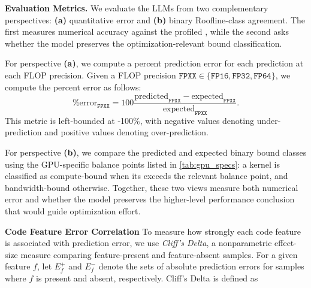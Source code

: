 \textbf{Evaluation Metrics.}
We evaluate the LLMs from two complementary perspectives: \textbf{(a)} quantitative \rai error and \textbf{(b)} binary Roofline-class agreement.
The first measures numerical accuracy against the profiled \rai, while the second asks whether the model preserves the optimization-relevant bound classification.

For perspective \textbf{(a)}, we compute a percent prediction error for each \rai prediction at each FLOP precision.
Given a FLOP precision $\texttt{FPXX} \in \{\texttt{FP16}, \texttt{FP32}, \texttt{FP64}\}$, we compute the percent error as follows:
\[
\text{\% error}_{\texttt{FPXX}} = 100\frac{\text{predicted}_{\texttt{FPXX}} - \text{expected}_{\texttt{FPXX}}}{\text{expected}_{\texttt{FPXX}}}.
\]
This metric is left-bounded at -100\%, with negative values denoting under-prediction and positive values denoting over-prediction.

For perspective \textbf{(b)}, we compare the predicted and expected binary bound classes using the GPU-specific balance points listed in \autoref{tab:gpu_specs}: a kernel is classified as compute-bound when its \rai exceeds the relevant balance point, and bandwidth-bound otherwise.
Together, these two views measure both numerical error and whether the model preserves the higher-level performance conclusion that would guide optimization effort.



\textbf{Code Feature Error Correlation}
To measure how strongly each code feature is associated with \rai prediction error, we use \emph{Cliff's Delta}, a nonparametric effect-size measure comparing feature-present and feature-absent samples.
For a given feature $f$, let $E_f^{+}$ and $E_f^{-}$ denote the sets of absolute \rai prediction errors for samples where $f$ is present and absent, respectively.
Cliff's Delta is defined as

